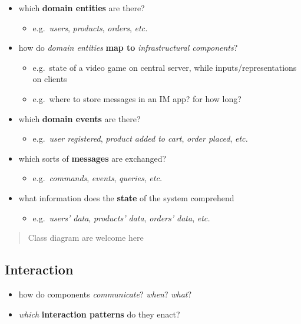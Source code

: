 \documentclass{scrartcl}
\begin{document}
\begin{itemize}
  \item which \textbf{domain entities} are there?
  \begin{itemize}
    \item e.g.~\emph{users}, \emph{products}, \emph{orders}, \emph{etc.}
  \end{itemize}
  
  \item how do \emph{domain entities} \textbf{map to} \emph{infrastructural components}?
  \begin{itemize}
    \item e.g.~state of a video game on central server, while inputs/representations on clients
    \item e.g.~where to store messages in an IM app? for how long?
  \end{itemize}

  \item which \textbf{domain events} are there?
  \begin{itemize}
    \item e.g.~\emph{user registered}, \emph{product added to cart}, \emph{order placed}, \emph{etc.}
  \end{itemize}
  
  \item which sorts of \textbf{messages} are exchanged?
  \begin{itemize}
    \item e.g.~\emph{commands}, \emph{events}, \emph{queries}, \emph{etc.}
  \end{itemize}

  \item what information does the \textbf{state} of the system comprehend
  \begin{itemize}
    \item e.g.~\emph{users' data}, \emph{products' data}, \emph{orders' data}, \emph{etc.}
  \end{itemize}
\end{itemize}

\begin{quote}
Class diagram are welcome here
\end{quote}

\subsection{Interaction}\label{interaction}

\begin{itemize}
  \item how do components \emph{communicate}? \emph{when}? \emph{what}?
  \item \emph{which} \textbf{interaction patterns} do they enact?
\end{itemize}
\end{document}

